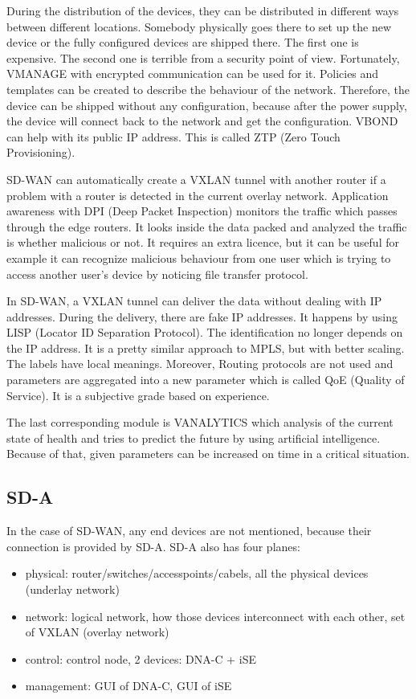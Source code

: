 \documentclass{article}
\begin{document}
During the distribution of the devices, they can be distributed in different ways between different locations. Somebody physically goes there to set up the new device or the fully configured devices are shipped there. The first one is expensive. The second one is terrible from a security point of view. Fortunately, VMANAGE with encrypted communication can be used for it. Policies and templates can be created to describe the behaviour of the network. Therefore, the device can be shipped without any configuration, because after the power supply, the device will connect back to the network and get the configuration. VBOND can help with its public IP address. This is called ZTP (Zero Touch Provisioning). 

SD-WAN can automatically create a VXLAN tunnel with another router if a problem with a router is detected in the current overlay network. Application awareness with DPI (Deep Packet Inspection) monitors the traffic which passes through the edge routers. It looks inside the data packed and analyzed the traffic is whether malicious or not. It requires an extra licence, but it can be useful for example it can recognize malicious behaviour from one user which is trying to access another user's device by noticing file transfer protocol.

In SD-WAN, a VXLAN tunnel can deliver the data without dealing with IP addresses. During the delivery, there are fake IP addresses. It happens by using LISP (Locator ID Separation Protocol). The identification no longer depends on the IP address. It is a pretty similar approach to MPLS, but with better scaling. The labels have local meanings. Moreover, Routing protocols are not used and parameters are aggregated into a new parameter which is called QoE (Quality of Service). It is a subjective grade based on experience.

The last corresponding module is VANALYTICS which analysis of the current state of health and tries to predict the future by using artificial intelligence. Because of that, given parameters can be increased on time in a critical situation. 

\subsection{SD-A}
In the case of SD-WAN, any end devices are not mentioned, because their connection is provided by SD-A. SD-A also has four planes:
\begin{itemize}
    \item physical: router/switches/accesspoints/cabels, all the physical devices (underlay network)
    \item network: logical network, how those devices interconnect with each other, set of VXLAN (overlay network)
    \item control: control node, 2 devices: DNA-C + iSE
    \item management: GUI of DNA-C, GUI of iSE
\end{itemize}
\end{document}
